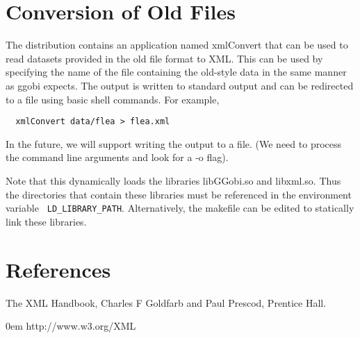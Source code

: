\documentclass{article}
\def\strip#1>{}
\def\Escape#1{\def\next{#1}%
{\frenchspacing\expandafter\strip\meaning\next}}
\def\Env#1{{\gray\texttt{\Escape{#1}}}}
\begin{document}
\section{Conversion of Old Files}
The distribution contains an application named xmlConvert that can be
used to read datasets provided in the old file format to XML.  This
can be used by specifying the name of the file containing the
old-style data in the same manner as ggobi expects.
The output is written to standard output
and can be redirected to a file using basic shell commands.
For example,
\begin{verbatim}
  xmlConvert data/flea > flea.xml
\end{verbatim}
In the future, we will support writing the output to a file. (We need
to process the command line arguments and look for a -o flag).

Note that this dynamically loads the libraries libGGobi.so and
libxml.so.  Thus the directories that contain these libraries must be
referenced in the environment variable 
\Env{LD_LIBRARY_PATH}.
Alternatively, the makefile can be edited to statically link these
libraries.

\begin{comment}
\section{Compilation}
To activate the XML mechanism, define the variable
\Env{USE_XML} in  local.config.

When we use autoconf, this can be done by
\begin{verbatim}
  ./configure --with-xml
\end{verbatim}

This requires the XML parsing library libxml (also know as gnome-xml)
by Daniel Veillard.  (\texttt{Daniel.Veillard@w3.org}).  See
\Escape{http://xmlsoft.org}
\end{comment}


\section{References}
The XML Handbook, Charles F Goldfarb and Paul Prescod,
 Prentice Hall.

\vspace{1em} \parindent 0em
http://www.w3.org/XML
\end{document}

